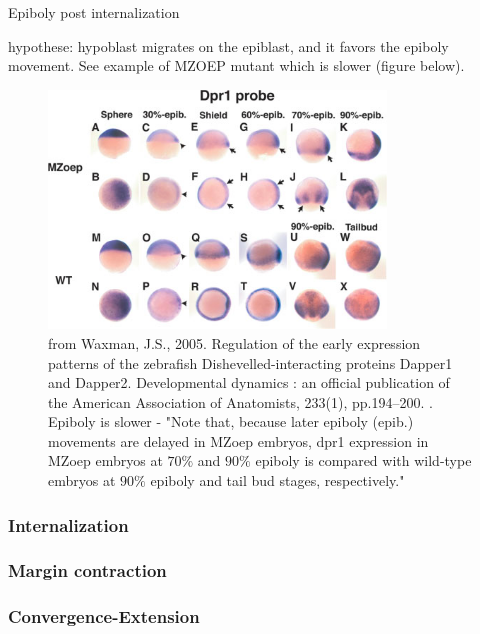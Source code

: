    Epiboly post internalization  

   hypothese: hypoblast migrates on the epiblast, and it favors the epiboly movement. See example of MZOEP mutant which is slower (figure below).  
\begin{figure}
\begin{center}
\includegraphics[width=0.8\textwidth]{../../images/Cases_Studies/Case_7_Convergence_extension/waxman_2005.png}
\end{center}
\caption{from Waxman, J.S., 2005. Regulation of the early expression patterns of the zebrafish Dishevelled-interacting proteins Dapper1 and Dapper2. Developmental dynamics : an official publication of the American Association of Anatomists, 233(1), pp.194–200. \cite{Waxman:2005fe}. Epiboly is slower - "Note that, because later epiboly (epib.) movements are delayed in MZoep embryos, dpr1 expression in MZoep embryos at $70\%$ and $90\%$ epiboly is compared with wild-type embryos at $90\%$ epiboly and tail bud stages, respectively."}
\label{Case_Epi_Convergence_extension_waxman_2005}
\end{figure}

\subsubsection{Internalization  }

\subsubsection{Margin contraction  }

\subsubsection{Convergence-Extension  }

